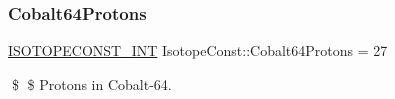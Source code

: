 \subsubsection{\texorpdfstring{Cobalt64\+Protons}{Cobalt64Protons}}
{\footnotesize\ttfamily \mbox{\hyperlink{group___isotope_const-_macros_ga5f18360b3e99483a35c32d789e62621c}{I\+S\+O\+T\+O\+P\+E\+C\+O\+N\+S\+T\+\_\+\+I\+NT}} Isotope\+Const\+::\+Cobalt64\+Protons = 27}

\$ \$ Protons in Cobalt-\/64. 
